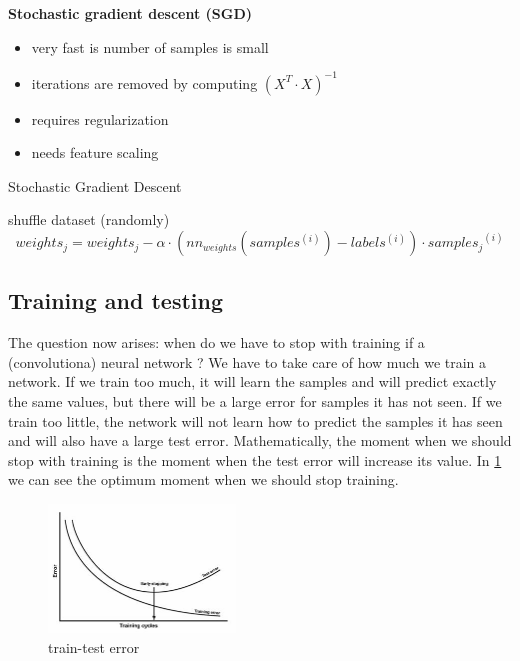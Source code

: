 \vspace{8mm}


\textbf{Stochastic gradient descent (SGD)}

\begin{itemize}
	\item{very fast is number of samples is small}
	\item{iterations are removed by computing $(X^T\cdot X)^{-1}$}
	\item{requires regularization}
	\item{needs feature scaling}
\end{itemize}

\begin{algorithm}
	\caption{Stochastic Gradient Descent\cite{ng}} \label{sgd-code}
	\begin{algorithmic}[1]
		\Repeat
			\State shuffle dataset (randomly)
       				\State\begin{equation}
					weights_j = weights_j - \alpha\cdot(nn_{weights}(samples^{(i)}) - labels^{(i)})\cdot {samples_j}^{(i)}
					\end{equation}
      			\EndFor
      		\EndFor
	\end{algorithmic}
\end{algorithm}

\newpage

\subsection{Training and testing}
\label{train-test}

The question now arises: when do we have to stop with training if a (convolutiona) neural network ?
We have to take care of how much we train a network. If we train too much, it will learn the samples and will predict exactly the same values, but there will be a large error for samples it has not seen. If we train too little, the network will not learn how to predict the samples it has seen and will also have a large test error.
Mathematically, the moment when we should stop with training is the moment when the test error will increase its value. In \ref{fig:traintest} we can see the optimum moment when we should stop training.

\begin{figure}[h]
	\begin{center}
		\includegraphics[width=188px,height=129px]{src/img/state/traintest}
		\caption{train-test error\cite{traintest}} \label{fig:traintest}
    \end{center}
\end{figure}

